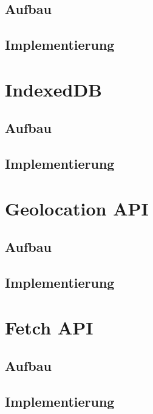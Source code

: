 
\subsection{Aufbau}
\subsection{Implementierung}

\section{IndexedDB}
\subsection{Aufbau}
\subsection{Implementierung}

\section{Geolocation API}
\subsection{Aufbau}
\subsection{Implementierung}



\section{Fetch API}
\subsection{Aufbau}
\subsection{Implementierung}










